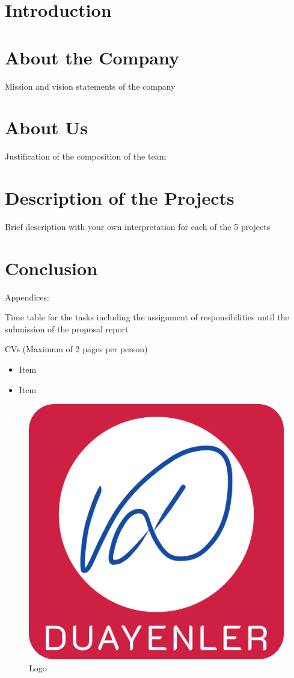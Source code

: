 \section{Introduction}
\-\indent 
	

\section{About the Company}
Mission and vision statements of the company

\section{About Us}
Justification of the composition of the team

\section{Description of the Projects}
Brief description with your own interpretation for each of the 5 projects


\section{Conclusion}
Appendices:

Time table for the tasks including the assignment of responsibilities until the submission of the proposal report

CVs (Maximum of 2 pages per person)


\begin{itemize}
\item Item
\item Item
\end{itemize}


\begin{figure}[H]
\center
\setlength{\unitlength}{\textwidth} 
\includegraphics[width=0.7\unitlength]{images/logo1}
\caption{\label{fig:logo}Logo }
\end{figure}


